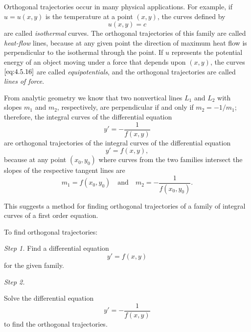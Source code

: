 \documentclass{ximera}
\begin{document}
 
Orthogonal trajectories occur in many physical applications.
For example, if $u=u(x,y)$ is the temperature at a point $(x,y)$,  the
curves defined by
\begin{equation} \label{eq:4.5.16}
u(x,y)=c
\end{equation}
are called \textit{isothermal} curves. The orthogonal trajectories of
this family are called \textit{heat-flow} lines, because at any given
point the direction of maximum heat flow is perpendicular to the
isothermal through the point. If $u$ represents the potential energy
of an object moving under a force that depends upon $(x,y)$,  the
curves $\eqref{eq:4.5.16}$ are called \textit{equipotentials}, and the
orthogonal trajectories are called \textit{lines of force}.
 
From analytic geometry we know that two nonvertical lines $L_1$ and
$L_2$ with slopes $m_1$ and $m_2$, respectively, are perpendicular if
and only if $m_2=-1/m_1$;  therefore, the integral curves of the
differential equation
$$
y'=-\frac{1}{f(x,y)}
$$
are orthogonal trajectories of the integral curves of the differential
equation
$$
y'=f(x,y),
$$
because at any point $(x_0,y_0)$ where curves from the two families
intersect the slopes of the respective tangent lines are
$$
m_1=f(x_0,y_0)\quad\mbox{and}\quad m_2=-\frac{1}{f(x_0,y_0)}.
$$
 
This suggests a  method for finding orthogonal trajectories
of a family of integral curves of a first order equation.
 
\begin{procedure}\label{proc:orthTraj}
To find orthogonal trajectories:

\textit{Step 1.}
Find a differential equation
$$
y'=f(x,y)
$$
 for the given family.
 
\textit{Step 2.}
 
Solve the differential equation
$$
y'=-\frac{1}{f(x,y)}
$$
to find the orthogonal trajectories.

\end{procedure}
 
\end{document}
